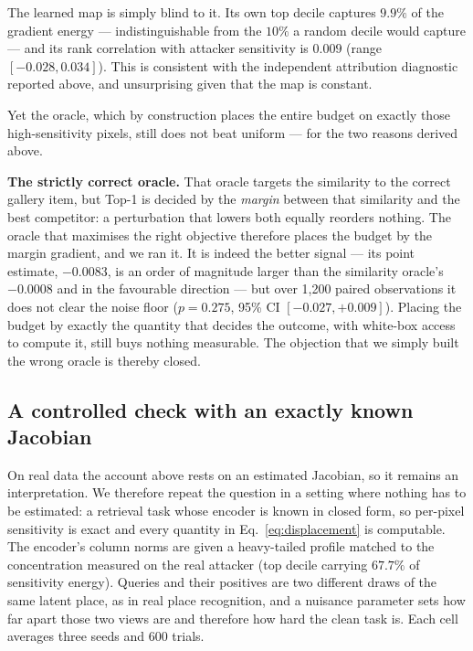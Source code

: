 \documentclass[10pt,journal]{IEEEtran}
\begin{document}
The learned map is simply blind to it. Its own top decile captures $9.9\%$ of
the gradient energy --- indistinguishable from the $10\%$ a random decile
would capture --- and its rank correlation with attacker sensitivity is
$0.009$ (range $[-0.028, 0.034]$). This is consistent with the independent
attribution diagnostic reported above, and unsurprising given that the map is
constant.

Yet the oracle, which by construction places the entire budget on exactly
those high-sensitivity pixels, still does not beat uniform --- for the two
reasons derived above.

\textbf{The strictly correct oracle.} That oracle targets the similarity to
the correct gallery item, but Top-1 is decided by the \emph{margin} between
that similarity and the best competitor: a perturbation that lowers both
equally reorders nothing. The oracle that maximises the right objective
therefore places the budget by the margin gradient, and we ran it. It is
indeed the better signal --- its point estimate, $-0.0083$, is an order of
magnitude larger than the similarity oracle's $-0.0008$ and in the favourable
direction --- but over 1,200 paired observations it does not clear the noise
floor ($p=0.275$, 95\% CI $[-0.027, +0.009]$). Placing the budget by exactly
the quantity that decides the outcome, with white-box access to compute it,
still buys nothing measurable. The objection that we simply built the wrong
oracle is thereby closed.

\subsection{A controlled check with an exactly known Jacobian}
\label{sec:known-jacobian}

On real data the account above rests on an estimated Jacobian, so it remains
an interpretation. We therefore repeat the question in a setting where nothing
has to be estimated: a retrieval task whose encoder is known in closed form,
so per-pixel sensitivity is exact and every quantity in
Eq.~\eqref{eq:displacement} is computable. The encoder's column norms are
given a heavy-tailed profile matched to the concentration measured on the real
attacker (top decile carrying $67.7\%$ of sensitivity energy). Queries and
their positives are two different draws of the same latent place, as in real
place recognition, and a nuisance parameter sets how far apart those two views
are and therefore how hard the clean task is. Each cell averages three seeds
and 600 trials.
\end{document}
